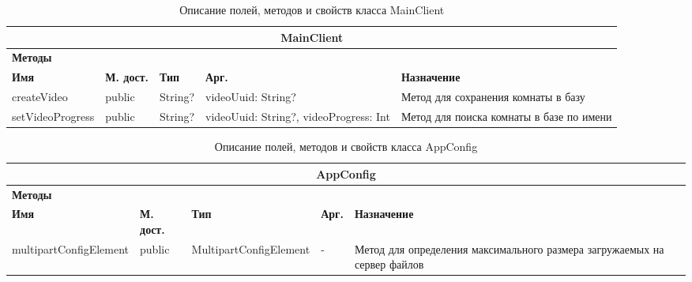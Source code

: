 \documentclass{../includes/TechDoc}
\begin{document}
    \begin{table}[h]
        \caption{\label{tab:class-MainClient-table}Описание полей, методов и свойств класса MainClient}
        \begin{tabularx}{\textwidth}{|l|l|l|l|X|}
            \hline
            \multicolumn{5}{|c|}{MainClient} \\ \hline
            \multicolumn{5}{|l|}{\textbf{Методы}} \\ \hline
            \textbf{Имя}     & \textbf{М. дост.} & \textbf{Тип} & \textbf{Арг.}                          & \textbf{Назначение}                      \\ \hline
            createVideo      & public            & String?      & videoUuid: String?                     & Метод для сохранения комнаты в базу      \\ \hline
            setVideoProgress & public            & String?      & videoUuid: String?, videoProgress: Int & Метод для поиска комнаты в базе по имени \\ \hline
        \end{tabularx}
    \end{table}

    \begin{table}[h]
        \caption{\label{tab:class-AppConfig-table}Описание полей, методов и свойств класса AppConfig}
        \begin{tabularx}{\textwidth}{|l|l|l|l|X|}
            \hline
            \multicolumn{5}{|c|}{AppConfig} \\ \hline
            \multicolumn{5}{|l|}{\textbf{Методы}} \\ \hline
            \textbf{Имя}           & \textbf{М. дост.} & \textbf{Тип}           & \textbf{Арг.} & \textbf{Назначение}                                                      \\ \hline
            multipartConfigElement & public            & MultipartConfigElement & -             & Метод для определения максимального размера загружаемых на сервер файлов \\ \hline
        \end{tabularx}
    \end{table}
\end{document}
